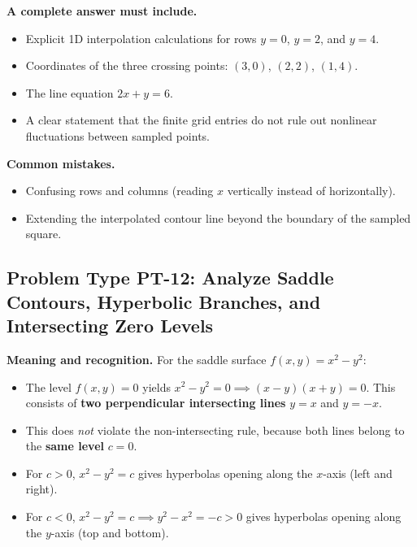 \documentclass[11pt,letterpaper]{article}
\begin{document}
\textbf{A complete answer must include.}
\begin{itemize}[leftmargin=*,nosep]
    \item Explicit 1D interpolation calculations for rows $y=0$, $y=2$, and $y=4$.
    \item Coordinates of the three crossing points: $(3,0)$, $(2,2)$, $(1,4)$.
    \item The line equation $2x + y = 6$.
    \item A clear statement that the finite grid entries do not rule out nonlinear fluctuations between sampled points.
\end{itemize}

\textbf{Common mistakes.}
\begin{itemize}[leftmargin=*,nosep]
    \item Confusing rows and columns (reading $x$ vertically instead of horizontally).
    \item Extending the interpolated contour line beyond the boundary of the sampled square.
\end{itemize}

\subsection{Problem Type PT-12: Analyze Saddle Contours, Hyperbolic Branches, and Intersecting Zero Levels}\label{pt:12}

\textbf{Meaning and recognition.} 
For the saddle surface $f(x,y) = x^2 - y^2$:
\begin{itemize}[leftmargin=*,nosep]
    \item The level $f(x,y) = 0$ yields $x^2 - y^2 = 0 \implies (x-y)(x+y) = 0$. This consists of \textbf{two perpendicular intersecting lines} $y = x$ and $y = -x$.
    \item This does \emph{not} violate the non-intersecting rule, because both lines belong to the \textbf{same level} $c=0$.
    \item For $c > 0$, $x^2 - y^2 = c$ gives hyperbolas opening along the $x$-axis (left and right).
    \item For $c < 0$, $x^2 - y^2 = c \implies y^2 - x^2 = -c > 0$ gives hyperbolas opening along the $y$-axis (top and bottom).
\end{itemize}
\end{document}
